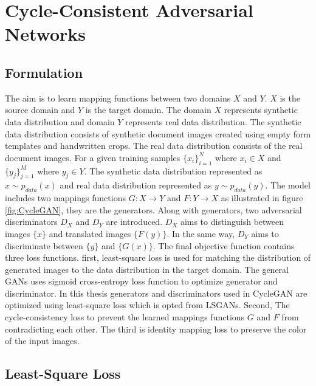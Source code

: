 \section{Cycle-Consistent Adversarial Networks}\label{CycleConsistentAdversarialNetworks}


\subsection{Formulation}


The aim is to learn mapping functions between two domains $X$ and $Y$. $X$ is the source domain and $Y$ is the target domain. The domain $X$ represents synthetic data distribution and domain $Y$ represents real data distribution. The synthetic data distribution consists of synthetic document images created using empty form templates and handwritten crops. The real data distribution consists of the real document images. For a given training samples $\{x_i\}_{i=1}^{N}$ where $x_i \in X$ and $\{y_j\}_{j=1}^{M}$ where $y_j \in Y$. The synthetic data distribution represented as $x \sim p_{data}(x)$ and real data distribution represented as $y \sim p_{data}(y)$. The model includes two mappings functions $G : X \rightarrow Y$ and $F : Y \rightarrow X$ as illustrated in figure \ref{fig:CycleGAN}, they are the generators. Along with generators, two adversarial discriminators $D_X$ and $D_Y$ are introduced. $D_X$ aims to distinguish between images $\{x\}$ and translated images $\{F(y)\}$. In the same way, $D_Y$ aims to discriminate between $\{y\}$ and $\{G(x)\}$.  The final objective function contains three loss functions. first, least-square loss\cite{mao2017squares} is used for matching the distribution of generated images to the data distribution in the target domain. The general \acp{GAN} uses sigmoid cross-entropy loss function to optimize generator and discriminator. In this thesis generators and discriminators used in \ac{CycleGAN} are optimized using least-square loss\cite{mao2017squares} which is opted from \acp{LSGAN}. Second, The cycle-consistency loss to prevent the learned mappings functions $G$ and $F$ from contradicting each other\cite{zhu2020unpaired}. The third is identity mapping loss to preserve the color of the input images\cite{zhu2020unpaired}.


\subsection{Least-Square Loss}


